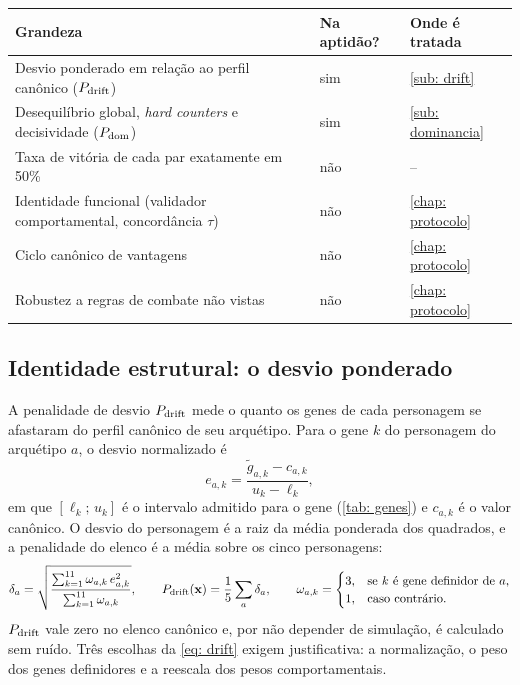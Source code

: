 \begin{quadro}[htb]
    \caption{O que a busca otimiza e o que é medido apenas \textit{post hoc}.}
    \label{quad: otimizado}
    \centering
    \small
    \begin{tabularx}{\textwidth}{X l l}
        \toprule
        \textbf{Grandeza} & \textbf{Na aptidão?} & \textbf{Onde é tratada} \\
        \midrule
        Desvio ponderado em relação ao perfil canônico ($P_{\mathrm{drift}}$) & sim & \autoref{sub: drift} \\
        Desequilíbrio global, \textit{hard counters} e decisividade ($P_{\mathrm{dom}}$) & sim & \autoref{sub: dominancia} \\
        Taxa de vitória de cada par exatamente em 50\% & não & -- \\
        Identidade funcional (validador comportamental, concordância $\tau$) & não & \autoref{chap: protocolo} \\
        Ciclo canônico de vantagens & não & \autoref{chap: protocolo} \\
        Robustez a regras de combate não vistas & não & \autoref{chap: protocolo} \\
        \bottomrule
    \end{tabularx}
    \source
\end{quadro}

\subsection{Identidade estrutural: o desvio ponderado}
\label{sub: drift}

A penalidade de desvio $P_{\mathrm{drift}}$ mede o quanto os genes de cada personagem se afastaram do perfil canônico de seu arquétipo. Para o gene $k$ do personagem do arquétipo $a$, o desvio normalizado é
\begin{equation}
    \label{eq: desvio_gene}
    e_{a,k} = \frac{\tilde{g}_{a,k} - c_{a,k}}{u_k - \ell_k},
\end{equation}
em que $[\ell_k;\, u_k]$ é o intervalo admitido para o gene (\autoref{tab: genes}) e $c_{a,k}$ é o valor canônico. O desvio do personagem é a raiz da média ponderada dos quadrados, e a penalidade do elenco é a média sobre os cinco personagens:
\begin{equation}
    \label{eq: drift}
    \delta_a = \sqrt{\frac{\sum_{k=1}^{11} \omega_{a,k}\, e_{a,k}^2}{\sum_{k=1}^{11} \omega_{a,k}}},
    \qquad
    P_{\mathrm{drift}}(\mathbf{x}) = \frac{1}{5} \sum_{a} \delta_a,
    \qquad
    \omega_{a,k} =
    \begin{cases}
        3, & \text{se } k \text{ é gene definidor de } a,\\
        1, & \text{caso contrário.}
    \end{cases}
\end{equation}
$P_{\mathrm{drift}}$ vale zero no elenco canônico e, por não depender de simulação, é calculado sem ruído. Três escolhas da \autoref{eq: drift} exigem justificativa: a normalização, o peso dos genes definidores e a reescala dos pesos comportamentais.

